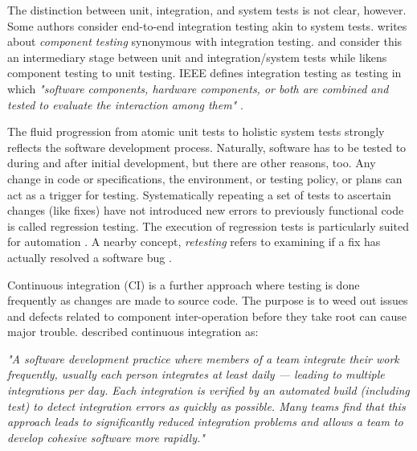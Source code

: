 \documentclass[12pt,a4paper,oneside,pdftex]{report}
\begin{document}
The distinction between unit, integration, and system tests is not clear, however. Some authors consider end-to-end integration testing akin to system tests. \citet{duvall2007continuous} writes about \emph{component testing} synonymous with integration testing. \citet{pezze2008software} and \citet{benz2007combining} consider this an intermediary stage between unit and integration/system tests while \citet{burnstein2003practical} likens component testing to unit testing. IEEE defines integration testing as testing in which \emph{"software components, hardware components, or both are combined and tested to evaluate the interaction among them"} \citep{ieee2010systems}.

The fluid progression from atomic unit tests to holistic system tests strongly reflects the software development process. Naturally, software has to be tested to during and after initial development, but there are other reasons, too. Any change in code or specifications, the environment, or testing policy, or plans can act as a trigger for testing. Systematically repeating a set of tests to ascertain changes (like fixes) have not introduced new errors to previously functional code is called regression testing. The execution of regression tests is particularly suited for automation \citep{jenkins2008software}. A nearby concept, \textit{retesting} refers to examining if a fix has actually resolved a software bug \citep{jenkins2008software}.


Continuous integration (CI) is a further approach where testing is done frequently as changes are made to source code. The purpose is to weed out issues and defects related to component inter-operation before they take root can cause major trouble. \citet{fowler2006continuous} described continuous integration as:

\begin{adjustwidth}{2.5em}{0pt}
\small
\emph{"A software development practice where members of a team integrate their work frequently, usually each person integrates at least daily --- leading to multiple integrations per day. Each integration is verified by an automated build (including test) to detect integration errors as quickly as possible. Many teams find that this approach leads to significantly reduced integration problems and allows a team to develop cohesive software more rapidly."}
\normal
\end{adjustwidth}
\end{document}
